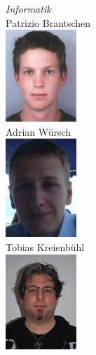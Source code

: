 \hfill
\begin{minipage}{0.4\textwidth}
\begin{flushright} \large
\emph{Informatik}\\
Patrizio Brantschen\\
\includegraphics[width=0.2\textwidth]{./04_Projektmanagement/fig/patriziobrantschen.jpg}\\
Adrian Würsch\\
\includegraphics[width=0.2\textwidth]{./04_Projektmanagement/fig/adrianwuersch.jpg}\\
Tobias Kreienbühl\\
\includegraphics[width=0.2\textwidth]{./04_Projektmanagement/fig/tobiaskreienbuehl.jpg}\\
\end{flushright}
\end{minipage}









